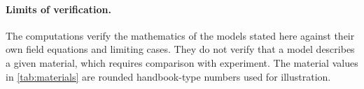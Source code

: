 \paragraph{Limits of verification.} The computations verify the mathematics of the models stated here against their own field equations and limiting cases. They do not verify that a model describes a given material, which requires comparison with experiment. The material values in \cref{tab:materials} are rounded handbook-type numbers used for illustration.
